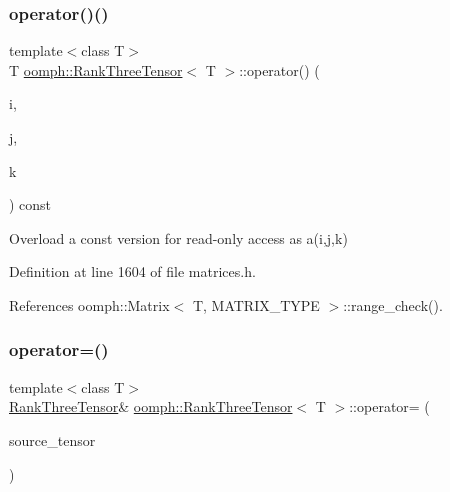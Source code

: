 \subsubsection{\texorpdfstring{operator()()}{operator()()}\hspace{0.1cm}{\footnotesize\ttfamily [2/2]}}
{\footnotesize\ttfamily template$<$class T$>$ \\
T \hyperlink{classoomph_1_1RankThreeTensor}{oomph\+::\+Rank\+Three\+Tensor}$<$ T $>$\+::operator() (\begin{DoxyParamCaption}\item[{const unsigned long \&}]{i,  }\item[{const unsigned long \&}]{j,  }\item[{const unsigned long \&}]{k }\end{DoxyParamCaption}) const\hspace{0.3cm}{\ttfamily [inline]}}



Overload a const version for read-\/only access as a(i,j,k) 



Definition at line 1604 of file matrices.\+h.



References oomph\+::\+Matrix$<$ T, M\+A\+T\+R\+I\+X\+\_\+\+T\+Y\+P\+E $>$\+::range\+\_\+check().

\mbox{\label{classoomph_1_1RankThreeTensor_ad79699cce8e7432fa7ccf880345059f8}} 
\subsubsection{\texorpdfstring{operator=()}{operator=()}}
{\footnotesize\ttfamily template$<$class T$>$ \\
\hyperlink{classoomph_1_1RankThreeTensor}{Rank\+Three\+Tensor}\& \hyperlink{classoomph_1_1RankThreeTensor}{oomph\+::\+Rank\+Three\+Tensor}$<$ T $>$\+::operator= (\begin{DoxyParamCaption}\item[{const \hyperlink{classoomph_1_1RankThreeTensor}{Rank\+Three\+Tensor}$<$ T $>$ \&}]{source\+\_\+tensor }\end{DoxyParamCaption})\hspace{0.3cm}{\ttfamily [inline]}}



